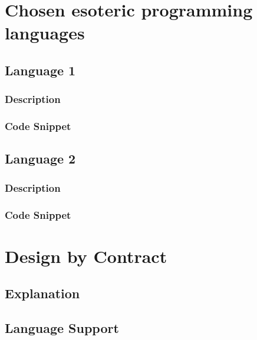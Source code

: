 \documentclass[12pt]{article}
\begin{document}
\section{Chosen esoteric programming languages \hfill {}}
\subsection{Language 1}
\subsubsection{Description}
\subsubsection{Code Snippet}
\subsection{Language 2}
\subsubsection{Description}
\subsubsection{Code Snippet}
\newpage

\section{Design by Contract \hfill {}}
\subsection{Explanation}
\subsection{Language Support}
\newpage



\end{document}
